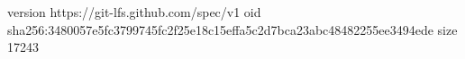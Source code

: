 version https://git-lfs.github.com/spec/v1
oid sha256:3480057e5fc3799745fc2f25e18c15effa5c2d7bca23abc48482255ee3494ede
size 17243
